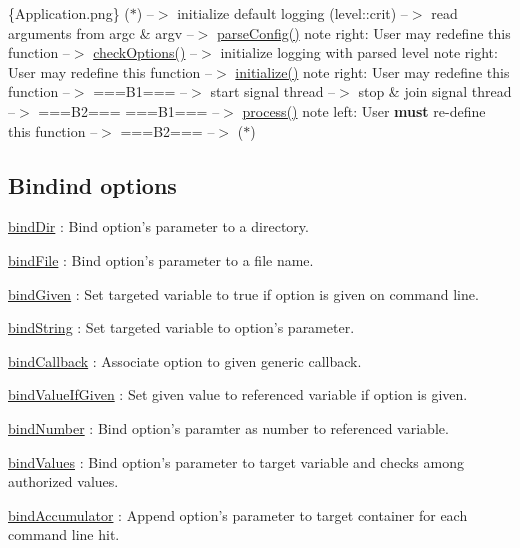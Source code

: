 \{Application.\-png\} ($\ast$) --$>$ initialize default logging (level\-::crit) --$>$ read arguments from argc \& argv --$>$ \hyperlink{classxtd_1_1Application_a8684d1d061027893f91580106a821d88}{parse\-Config()} note right\-: User may redefine this function --$>$ \hyperlink{classxtd_1_1Application_a3c63f070ac7baaea43a32b3064d0030b}{check\-Options()} --$>$ initialize logging with parsed level note right\-: User may redefine this function --$>$ \hyperlink{classxtd_1_1Application_ab8e835ba678494c42e12c4613958d18a}{initialize()} note right\-: User may redefine this function --$>$ ===B1=== --$>$ start signal thread --$>$ stop \& join signal thread --$>$ ===B2=== ===B1=== --$>$ \hyperlink{classxtd_1_1Application_aef6043d47982bc1983a84e2c8a53f0cd}{process()} note left\-: User {\bfseries must} re-\/define this function --$>$ ===B2=== --$>$ ($\ast$) \hypertarget{classxtd_1_1Application_sec_binding_options}{}\subsection{Bindind options}\label{classxtd_1_1Application_sec_binding_options}

\begin{DoxyItemize}
\item \hyperlink{classxtd_1_1Application_a2b491ba745bbd3b2d01d9e623c0aff60}{bind\-Dir} \-: Bind option's parameter to a directory.
\item \hyperlink{classxtd_1_1Application_ab10f6dde0bf4034dff7eafe8a45c2029}{bind\-File} \-: Bind option's parameter to a file name.
\item \hyperlink{classxtd_1_1Application_a59b986c85c2e1d9473f73df10425dfcf}{bind\-Given} \-: Set targeted variable to true if option is given on command line.
\item \hyperlink{classxtd_1_1Application_a36a351db3830e2e894a39fbd42842280}{bind\-String} \-: Set targeted variable to option's parameter.
\item \hyperlink{classxtd_1_1Application_a00f6aed6c376028a79492b04e8325968}{bind\-Callback} \-: Associate option to given generic callback.
\item \hyperlink{classxtd_1_1Application_a2415acb66badb368e726173fb884097c}{bind\-Value\-If\-Given} \-: Set given value to referenced variable if option is given.
\item \hyperlink{classxtd_1_1Application_ae5fd6c9b1d2ad5225f9d624f63df4173}{bind\-Number} \-: Bind option's paramter as number to referenced variable.
\item \hyperlink{classxtd_1_1Application_aaa0388f1c96893a26cfe5522b0804dd9}{bind\-Values} \-: Bind option's parameter to target variable and checks among authorized values.
\item \hyperlink{classxtd_1_1Application_a846da30aaf55754027608ddf5c689366}{bind\-Accumulator} \-: Append option's parameter to target container for each command line hit. 
\end{DoxyItemize}

